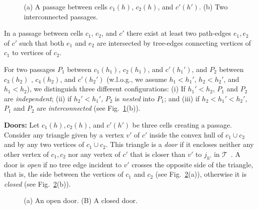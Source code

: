 \documentclass[a4paper,10pt]{llncs}
\newcounter{prop}
\newcommand{\T}{\mbox{$\mathcal T$ }}
\begin{document}
\begin{figure}[tb]
\caption{(a) A passage between cells $c_1(h)$, $c_2(h)$, and $c'(h')$. (b) Two interconnected passages.}\label{fig:passage}
\end{figure}

\begin{property}\label{prop:passage_2_edges}
In a passage between cells $c_1$, $c_2$, and $c'$ there exist at least two path-edges $e_1,e_2$ of $c'$ such that both $e_1$ and $e_2$ are intersected by tree-edges connecting vertices of $c_1$ to vertices of $c_2$.
\end{property}

For two passages $P_1$ between $c_1(h_1)$, $c_2(h_1)$, and $c'(h_1')$, and $P_2$ between $c_{3}(h_2)$ , $c_{4}(h_2)$, and $c'(h_2')$ (w.l.o.g., we assume $h_1< h_1'$, $h_2<h_2'$, and $h_1<h_2$), we distinguish three different configurations: (i) If $h_1' < h_2$, $P_1$ and $P_2$ are {\it independent}; (ii) if $h_2' < h_1'$, $P_2$ is {\it nested} into $P_1$; and (iii) if $h_2< h_1'< h_2'$, $P_1$ and $P_2$ are {\it interconnected} (see Fig.~\ref{fig:passage}(b)).

{\bf Doors:}
Let $c_1(h),c_2(h)$, and $c'(h')$ be three cells creating a passage. Consider any triangle given by a vertex $v'$ of $c'$ inside the convex hull of $c_1\cup c_2$ and by any two vertices of $c_1\cup c_2$.
This triangle is a \emph{door} if it encloses neither any other vertex of $c_1,c_2$ nor any vertex of $c'$ that is closer than $v'$ to $j_{h'}$ in \T. A door is \emph{open} if no tree edge incident to $v'$ crosses the opposite side of the triangle, that is, the side between the vertices of $c_1$ and $c_2$ (see Fig.~\ref{fig:door}(a)), otherwise it is \emph{closed} (see Fig.~\ref{fig:door}(b)).

\begin{figure}[hb]
\caption{(a) An open door. (B) A closed door.}\label{fig:door}
\end{figure}
\end{document}
